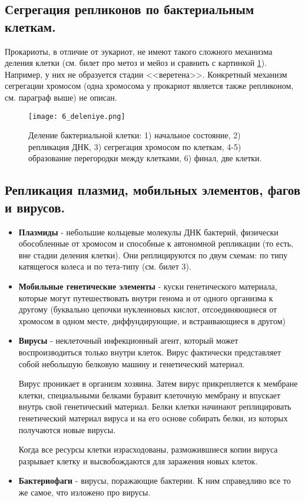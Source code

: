 \subsection{Сегрегация репликонов по бактериальным клеткам.}

Прокариоты, в отличие от эукариот, не имеют такого сложного механизма деления клетки (см. билет про метоз и мейоз и сравнить с картинкой \ref{fig:6_deleniye}). Например, у них не образуется стадии <<веретена>>. Конкретный механизм сегрегации хромосом (одна хромосома у прокариот является также репликоном, см. параграф выше) не описан. 

\begin{figure}[h!]
    \centering
    \texttt{[image: 6\_deleniye.png]}
    \caption{Деление бактериальной клетки: 1)  начальное состояние, 2) репликация ДНК, 3) сегрегация хромосом по клеткам, 4-5) образование перегородки между клетками, 6) финал, две клетки.}
    \label{fig:6_deleniye}
\end{figure}

\subsection{Репликация плазмид, мобильных элементов, фагов и вирусов.}

\begin{itemize}
    \item \textbf{Плазмиды} - небольшие кольцевые молекулы ДНК бактерий, физически обособленные от хромосом и способные к автономной репликации (то есть, вне стадии деления клетки). Они реплицируются по двум схемам: по типу катящегося колеса и по тета-типу (см. билет 3).
    
    \item \textbf{Мобильные генетические элементы} - куски генетического материала, которые могут путешествовать внутри генома и от одного организма к другому (буквально цепочки нуклеиновых кислот, отсоединяющиеся от хромосом в одном месте, диффундирующие, и встраивающиеся в другом)
    
    \item \textbf{Вирусы} - неклеточный инфекционный агент, который может воспроизводиться только внутри клеток. Вирус фактически представляет собой небольшую белковую машину и генетический материал.
    
    Вирус проникает в организм хозяина. Затем вирус прикрепляется к мембране клетки, специальными белками буравит клеточную мембрану и впускает внутрь свой генетический материал. Белки клетки начинают реплицировать генетический материал вируса и на его основе собирать белки, из которых получаются новые вирусы. 
    
    Когда все ресурсы клетки израсходованы, разможившиеся копии вируса разрывает клетку и высвобождаются для заражения новых клеток.
    
    \item \textbf{Бактериофаги} - вирусы, поражающие бактерии. К ним справедливо все то же самое, что изложено про вирусы.
    
\end{itemize}

